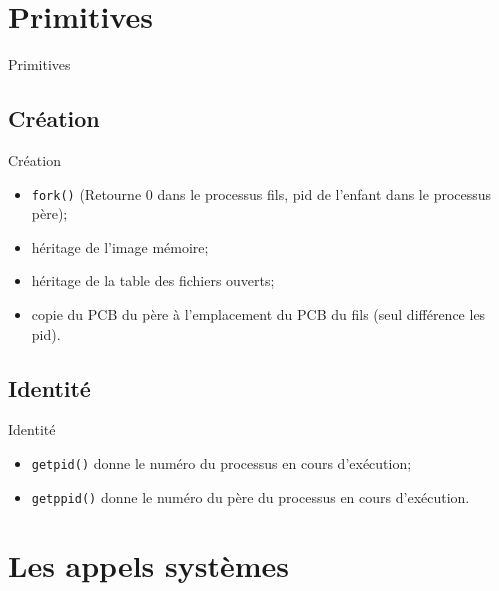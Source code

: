 \def\sectitle{Primitives}
\section{\sectitle}

\begin{frame}{\sectitle}

\def\subsectitle{Création}
\subsection{\subsectitle}

\begin{block}{\subsectitle}
\begin{itemize}
    \item \texttt{fork()} (Retourne 0 dans le processus fils, pid de l'enfant
    dans le processus père);
    \item héritage de l'image mémoire;
    \item héritage de la table des fichiers ouverts;
    \item copie du PCB du père à l'emplacement du PCB du fils (seul différence
    les pid).
\end{itemize}
\end{block}

\def\subsectitle{Identité}
\subsection{\subsectitle}

\begin{block}{\subsectitle}
\begin{itemize}
    \item \texttt{getpid()} donne le numéro du processus en cours d'exécution;
    \item \texttt{getppid()} donne le numéro du père du processus en cours
    d'exécution.
\end{itemize}
\end{block}

\end{frame}

\def\sectitle{Les appels systèmes}
\section{\sectitle}

